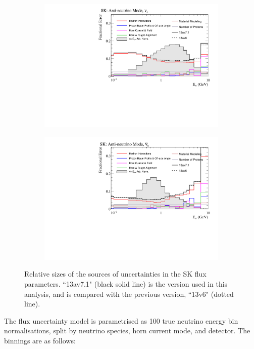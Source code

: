 \begin{figure}[!htbp]
\begin{subfigure}{.49\textwidth}
\end{subfigure}
\begin{subfigure}{.49\textwidth}
  \centering
  \includegraphics[width=0.99\linewidth]{figs/flux_error_t2k_sk_rhc_nue}
\end{subfigure}
\begin{subfigure}{.49\textwidth}
  \centering
  \includegraphics[width=0.99\linewidth]{figs/flux_error_t2k_sk_rhc_nuebar}
\end{subfigure}
\caption{Relative sizes of the sources of uncertainties in the SK flux parameters. ``13av7.1" (black solid line) is the version used in this analysis, and is compared with the previous version, ``13v6" (dotted line). }\label{fig:fluxsourceSK}
\end{figure}

The flux uncertainty model is parametrised as 100 true neutrino energy bin normalisations, split by neutrino species, horn current mode, and detector. The binnings are as follows:

